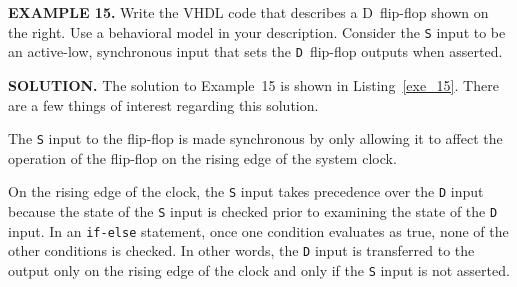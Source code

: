 \begin{leftbar}
\begin{minipage}{0.5\linewidth}
\noindent
\textbf{EXAMPLE 15.}
Write the VHDL code that describes a D~flip-flop shown on the right. Use a behavioral model in your description. Consider the \texttt{S} input to be an active-low, synchronous input that sets the \texttt{D}~flip-flop outputs when asserted.
\end{minipage}
\begin{minipage}{0.47\linewidth}
\begin{flushright}
\end{flushright}
\end{minipage}
\end{leftbar}
\noindent
\textbf{SOLUTION.} The solution to Example~15 is shown in Listing~\ref{exe_15}. There are a few things of interest regarding this solution.
\begin{my_list}
\item The \texttt{S} input to the flip-flop is made synchronous by only allowing it to affect the operation of the flip-flop on the rising edge of the system clock.
\item On the rising edge of the clock, the \texttt{S} input takes precedence over the \texttt{D} input because the state of the \texttt{S} input is checked prior to examining the state of the \texttt{D} input. In an \texttt{if-else} statement, once one condition evaluates as true, none of the other conditions is checked. In other words, the \texttt{D} input is transferred to the output only on the rising edge of the clock and only if the \texttt{S} input is not asserted.
\end{my_list}

